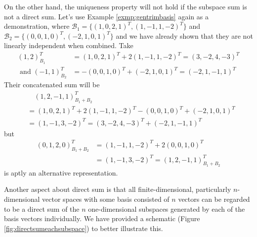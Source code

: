 On the other hand, the uniqueness property will not hold if the subspace sum is not a direct sum. Let's use Example \ref{exmp:gentrimbasis} again as a demonstration, where $\mathcal{B}_1 = \{(1,0,2,1)^T, (1,-1,1,-2)^T\}$ and $\mathcal{B}_2 = \{(0,0,1,0)^T, (-2,1,0,1)^T\}$ and we have already shown that they are not linearly independent when combined. Take
\begin{align*}
(1,2)_{B_1}^T &= (1,0,2,1)^T + 2(1,-1,1,-2)^T = (3,-2,4,-3)^T \\
\text{ and } (-1,1)_{B_2}^T &= -(0,0,1,0)^T + (-2,1,0,1)^T = (-2,1,-1,1)^T
\end{align*} Their concatenated sum will be 
\begin{align*}
&\quad (1,2,-1,1)_{B_1+B_2}^T \\ 
&= (1,0,2,1)^T + 2(1,-1,1,-2)^T - (0,0,1,0)^T + (-2,1,0,1)^T \\
&= (1,-1,3,-2)^T = (3,-2,4,-3)^T + (-2,1,-1,1)^T   
\end{align*}
but 
\begin{align*}
(0,1,2,0)_{B_1+B_2}^T &= (1,-1,1,-2)^T + 2(0,0,1,0)^T \\
&= (1,-1,3,-2)^T = (1,2,-1,1)_{B_1+B_2}^T 
\end{align*}
is aptly an alternative representation.

Another aspect about direct sum is that all finite-dimensional, particularly $n$-dimensional vector spaces with some basis consisted of $n$ vectors can be regarded to be a direct sum of the $n$ one-dimensional subspaces generated by each of the basis vectors individually. We have provided a schematic (Figure \ref{fig:directsumeachsubspace}) to better illustrate this.


